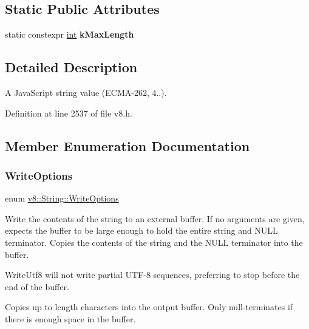 \subsection*{Static Public Attributes}
\begin{DoxyCompactItemize}
\item 
static constexpr \mbox{\hyperlink{classint}{int}} {\bfseries k\+Max\+Length}
\end{DoxyCompactItemize}


\subsection{Detailed Description}
A Java\+Script string value (E\+C\+M\+A-\/262, 4..). 

Definition at line 2537 of file v8.\+h.



\subsection{Member Enumeration Documentation}
\mbox{\label{classv8_1_1String_a9ce7f1458ffd08f8eb2b9c8dc056e616}} 
\subsubsection{\texorpdfstring{Write\+Options}{WriteOptions}}
{\footnotesize\ttfamily enum \mbox{\hyperlink{classv8_1_1String_a9ce7f1458ffd08f8eb2b9c8dc056e616}{v8\+::\+String\+::\+Write\+Options}}}

Write the contents of the string to an external buffer. If no arguments are given, expects the buffer to be large enough to hold the entire string and N\+U\+LL terminator. Copies the contents of the string and the N\+U\+LL terminator into the buffer.

Write\+Utf8 will not write partial U\+T\+F-\/8 sequences, preferring to stop before the end of the buffer.

Copies up to length characters into the output buffer. Only null-\/terminates if there is enough space in the buffer.


